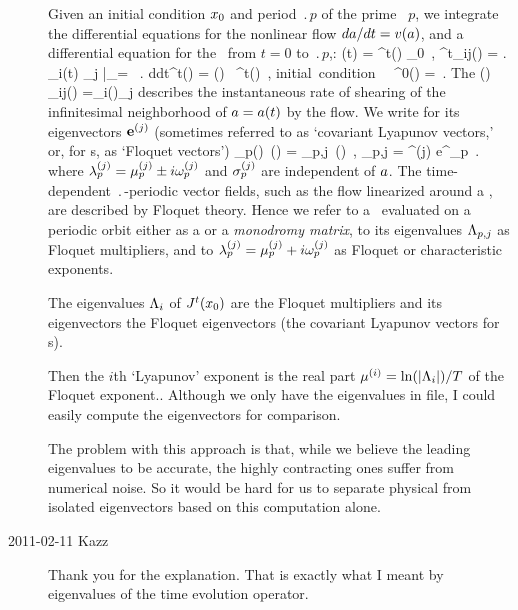 \begin{description}
Given an initial condition $\xInit$ and period $\period{p}$ of the prime 
\po\ $p$, we integrate
the differential equations for the nonlinear flow
$d\ssp/dt=v(\ssp)$, and a differential equation for the \jacobianM\ 
from $t=0$ to $\period{p}$,:
\beq
    \deltaX(t) = \jMps^t(\xInit) \deltaX_0
    \,, \qquad
\jMps^t_{ij}(\xInit)
  =  \left. {\pde \ssp_i(t) \over \pde \ssp_j} \right|_{\ssp=\xInit}
\, .
\label{hOdes}
\eeq
\beq
{d\over dt}\jMps^t(\xInit)
    = {\Mvar}(\ssp) \, \jMps^t(\xInit)
\,, \quad
\mbox{initial condition~~} \jMps^0(\xInit) = \matId
\,.
The {\stabmat} (\velgradmat)
\beq
{\Mvar}_{ij}(\ssp) ={\pde \vel_i(\ssp)\over \pde \ssp_j  }
describes the instantaneous rate of shearing of the infinitesimal
neighborhood of $\ssp=\ssp(t)$
by the flow.
We write for its
eigen\-vectors $\jEigvec[j]$
(sometimes referred to as `covariant Lyapunov vectors,'
or, for \po s, as `Floquet vectors')
\beq
\jMps_{p}(\ssp)\, \jEigvec[j](\ssp)
   = \ExpaEig_{p,j} \,\jEigvec[j] (\ssp)
\,,\qquad
\ExpaEig_{p,j}
= ^{(j)} e^{\eigExp[j]_p  }
\,.
where $\eigExp[j]_p = \eigRe[j]_p \pm i\eigIm[j]_p$
and $\sign{p}^{(j)}$ are independent of
$\ssp$.
The time-dependent
$\period{}$-periodic vector fields, such
as the flow linearized around a \po, are
described by Floquet theory. Hence
we refer to a \jacobianM\
evaluated on a periodic orbit either as
a {\em \FloquetM} or a {\em monodromy matrix}, to its
eigenvalues
$\ExpaEig_{p,j}$ as Floquet multipliers,
and to $\eigExp[j]_p = \eigRe[j]_p+i\eigIm[j]_p$ as Floquet or
characteristic exponents.



The eigenvalues $\ExpaEig_i$ of $\jMps^t(\xInit)$ are
the Floquet multipliers and its eigenvectors the Floquet eigenvectors
(the covariant Lyapunov vectors for \po s). 

Then the $i$th `Lyapunov' exponent is the real part
$\eigRe[i] = \ln(|\ExpaEig_i|)/ T$ of the Floquet exponent..
Although we only have the eigenvalues in file, I could easily compute
the eigenvectors for comparison.

The problem with this approach is that, while we believe the leading
eigenvalues to be accurate, the highly contracting ones suffer from
numerical noise. So it would be hard for us to separate physical from
isolated eigenvectors based on this computation alone.


\item[2011-02-11 Kazz] Thank you for the explanation. That is exactly what
I meant by eigenvalues of the time evolution operator.


\end{description}
